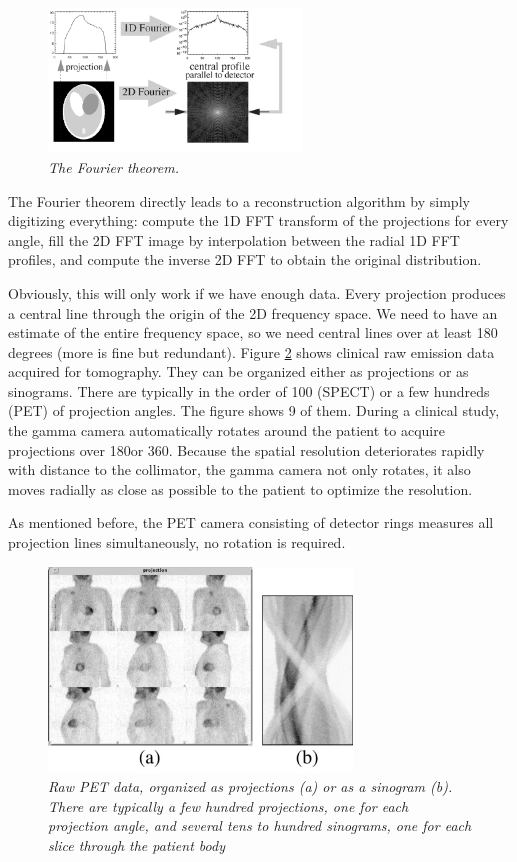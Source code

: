 \documentclass[11pt,oneside]{book}
\begin{document}
\begin{figure}[tb]
\centering
\includegraphics[width=0.6\textwidth]{figs/fig_fouriertheorem.pdf}
\caption{\emph{The Fourier theorem.}}
\label{fig:fouriertheorem} 
\end{figure}

The Fourier theorem directly leads to a reconstruction algorithm by simply
digitizing everything: compute the 1D FFT transform of the projections for
every angle, fill the 2D FFT image by interpolation between the radial 1D FFT
profiles, and compute the inverse 2D FFT to obtain the original distribution.

Obviously, this will only work if we have enough data. Every projection
produces a central line through the origin of the 2D frequency space. We need
to have an estimate of the entire frequency space, so we need central lines
over at least 180 degrees (more is fine but redundant).  Figure
\ref{fig:jnproj_sino} shows clinical raw emission data acquired for
tomography. They can be organized either as projections or as
sinograms. There are typically in the order of 100 (SPECT) or a few hundreds
(PET) of projection angles. The figure shows 9 of them. During a clinical
study, the gamma camera automatically rotates around the patient to acquire
projections over 180\textdegree or 360\textdegree. Because the spatial resolution
deteriorates rapidly with distance to the collimator, the gamma camera not
only rotates, it also moves radially as close as possible to the patient to
optimize the resolution.

As mentioned before, the PET camera consisting of detector rings measures all
projection lines simultaneously, no rotation is required.

\begin{figure}[tb]
\centering
\includegraphics[width=0.72\textwidth]{figs/fig_jnproj_sino.pdf}
\caption{\label{fig:jnproj_sino} \emph{Raw PET data, organized as projections
(a) or as a sinogram (b). There are typically a few hundred projections, one
for each projection angle, and several tens to hundred sinograms, one
for each slice through the patient body}}
\end{figure}
\end{document}
